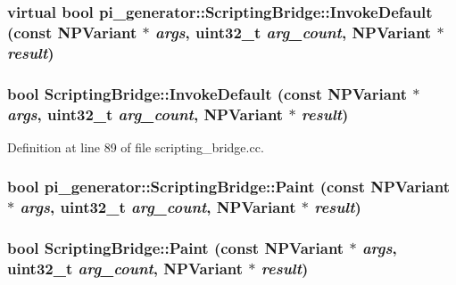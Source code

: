 \hypertarget{classpi__generator_1_1_scripting_bridge_abe1c6a84817b0a53c83527cbdc118dba}{
\subsubsection[{InvokeDefault}]{\setlength{\rightskip}{0pt plus 5cm}virtual bool pi\_\-generator::ScriptingBridge::InvokeDefault (const NPVariant $\ast$ {\em args}, \/  uint32\_\-t {\em arg\_\-count}, \/  NPVariant $\ast$ {\em result})}}
\label{classpi__generator_1_1_scripting_bridge_abe1c6a84817b0a53c83527cbdc118dba}
\hypertarget{classpi__generator_1_1_scripting_bridge_a2cee828951db15b4cce1074e934c4f97}{
\subsubsection[{InvokeDefault}]{\setlength{\rightskip}{0pt plus 5cm}bool ScriptingBridge::InvokeDefault (const NPVariant $\ast$ {\em args}, \/  uint32\_\-t {\em arg\_\-count}, \/  NPVariant $\ast$ {\em result})}}
\label{classpi__generator_1_1_scripting_bridge_a2cee828951db15b4cce1074e934c4f97}


Definition at line 89 of file scripting\_\-bridge.cc.

\hypertarget{classpi__generator_1_1_scripting_bridge_afcd2c9c3e990cae2d713e8bb5d84048d}{
\subsubsection[{Paint}]{\setlength{\rightskip}{0pt plus 5cm}bool pi\_\-generator::ScriptingBridge::Paint (const NPVariant $\ast$ {\em args}, \/  uint32\_\-t {\em arg\_\-count}, \/  NPVariant $\ast$ {\em result})}}
\label{classpi__generator_1_1_scripting_bridge_afcd2c9c3e990cae2d713e8bb5d84048d}
\hypertarget{classpi__generator_1_1_scripting_bridge_abfdee6fdc6c4f0cc6007425a14e8384e}{
\subsubsection[{Paint}]{\setlength{\rightskip}{0pt plus 5cm}bool ScriptingBridge::Paint (const NPVariant $\ast$ {\em args}, \/  uint32\_\-t {\em arg\_\-count}, \/  NPVariant $\ast$ {\em result})}}
\label{classpi__generator_1_1_scripting_bridge_abfdee6fdc6c4f0cc6007425a14e8384e}


